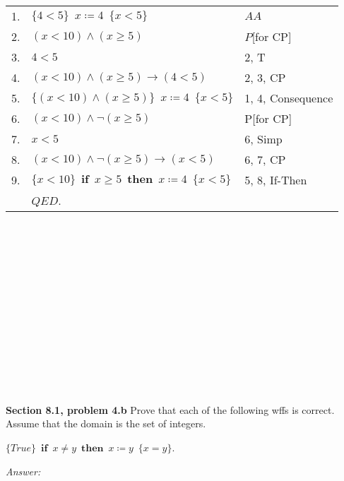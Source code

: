 \documentclass[12pt]{article}
\begin{document}
\begin{tabular}{p{.8cm}p{8.5cm}l}
1. & $\{4 < 5 \} \enspace x \coloneqq 4 \enspace \{ x < 5 \}$   & $AA$ \\
2. & \qquad $(x < 10) \land (x \geq 5)$ & $P$[for CP] \\
3. & \qquad $4 < 5$ & 2, T \\
4. & $(x < 10) \land (x \geq 5) \rightarrow (4 < 5)$  & 2, 3, CP \\
5. & $\{ (x < 10) \land (x \geq 5) \} \enspace x \coloneqq 4 \enspace \{ x < 5 \}$ 
                                                  & 1, 4, Consequence \\
6. & \qquad $(x < 10) \land \neg (x \geq 5)$ & P[for CP] \\
7. & \qquad $x < 5$ & 6, Simp \\
8. & $(x < 10) \land \neg (x \geq 5) \rightarrow (x < 5)$ & 6, 7, CP \\
9. & $\{ x < 10 \} \enspace \textbf{if} \enspace x \geq 5 \enspace \textbf{then} \enspace x 
      \coloneqq 4 \enspace \{ x < 5 \}$ & 5, 8, If-Then \\
& $QED$. \\
\end{tabular}
\\
\\
\\
\\
\\
\\
\\
\\
\\
\\
\\
\\
\\
\textbf{Section 8.1, problem 4.b}  Prove that each of the following wffs is correct. 
Assume that the domain is the set of integers.

$ \{ True \} \enspace \textbf{if} \enspace x \neq y \enspace \textbf{then} \enspace 
x \coloneqq y \enspace \{ x = y \}$.

\emph{Answer:} 
\end{document}
